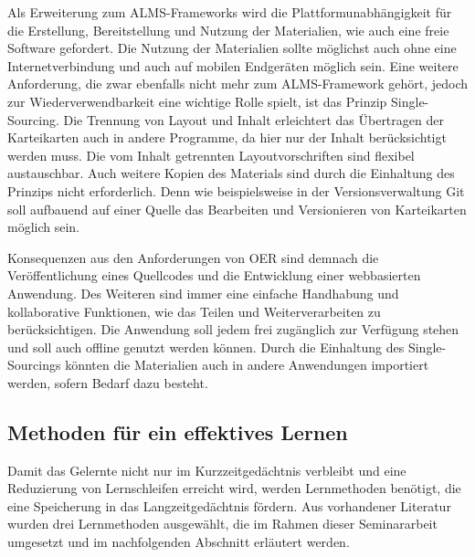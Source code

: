 Als Erweiterung zum ALMS-Frameworks wird die Plattformunabhängigkeit für die Erstellung, Bereitstellung und Nutzung der Materialien, wie auch eine freie Software gefordert. Die Nutzung der Materialien sollte möglichst auch ohne eine Internetverbindung und auch auf mobilen Endgeräten möglich sein. 
Eine weitere Anforderung, die zwar ebenfalls nicht mehr zum ALMS-Framework gehört, jedoch zur Wiederverwendbarkeit eine wichtige Rolle spielt, ist das Prinzip \glqq Single-Sourcing\grqq{}. Die Trennung von Layout und Inhalt erleichtert das Übertragen der Karteikarten auch in andere Programme, da hier nur der Inhalt berücksichtigt werden muss. Die vom Inhalt getrennten Layoutvorschriften sind flexibel austauschbar. Auch weitere Kopien des Materials sind durch die Einhaltung des Prinzips nicht erforderlich. Denn wie beispielsweise in der Versionsverwaltung Git soll aufbauend auf einer Quelle das Bearbeiten und Versionieren von Karteikarten möglich sein.


Konsequenzen aus den Anforderungen von OER sind demnach die Veröffentlichung eines Quellcodes und die Entwicklung einer webbasierten Anwendung. Des Weiteren sind immer eine einfache Handhabung und kollaborative Funktionen, wie das Teilen und Weiterverarbeiten zu berücksichtigen. Die Anwendung soll jedem frei zugänglich zur Verfügung stehen und soll auch offline genutzt werden können. Durch die Einhaltung des Single-Sourcings könnten die Materialien auch in andere Anwendungen importiert werden, sofern Bedarf dazu besteht.


\subsection{Methoden für ein effektives Lernen}
Damit das Gelernte nicht nur im Kurzzeitgedächtnis verbleibt und eine Reduzierung von Lernschleifen erreicht wird, werden Lernmethoden benötigt, die eine Speicherung in das Langzeitgedächtnis fördern. Aus vorhandener Literatur wurden drei Lernmethoden ausgewählt, die im Rahmen dieser Seminararbeit umgesetzt und im nachfolgenden Abschnitt erläutert werden.

